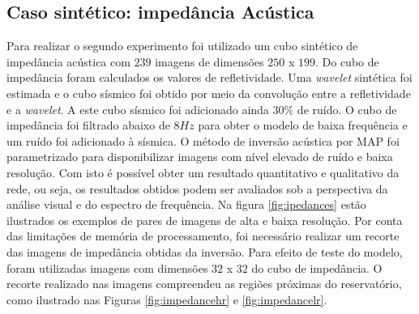 \subsection{Caso sintético: impedância Acústica}
Para realizar o segundo experimento foi utilizado um cubo sintético de impedância
acústica com $239$ imagens de dimensões $250$ x $199$. Do cubo de impedância foram calculados os
valores de refletividade. Uma \textit{wavelet}
sintética foi estimada e o cubo sísmico foi obtido por meio da
convolução entre a refletividade e a \textit{wavelet}. A este cubo sísmico foi adicionado ainda
$30\%$ de ruído. O cubo de impedância foi filtrado abaixo de $8Hz$ para obter o modelo de baixa frequência e
um ruído foi adicionado à sísmica. 
O método de inversão acústica por MAP foi parametrizado para disponibilizar imagens com nível elevado de ruído e baixa resolução.
Com isto é possível obter um resultado quantitativo e qualitativo da rede, ou seja, os resultados
obtidos podem ser avaliados sob a perspectiva da análise visual e do espectro de frequência.
Na figura \ref{fig:ipedances} estão ilustrados os exemplos de pares de imagens de alta e baixa resolução.
Por conta das limitações de memória de processamento, foi necessário realizar um recorte das imagens de impedância
obtidas da inversão. Para efeito de teste do modelo, foram utilizadas imagens com dimensões $32$ x $32$ do cubo de impedância.
O recorte realizado nas imagens compreendeu as regiões próximas do reservatório, como ilustrado nas Figuras \ref{fig:impedancehr}
e \ref{fig:impedancelr}.

